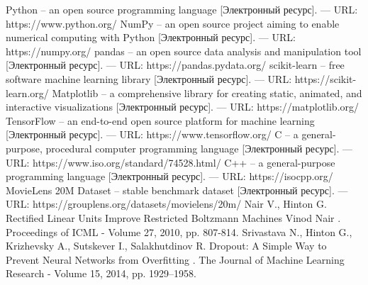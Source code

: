 \documentclass[a4paper,article,14pt]{extarticle}
\begin{document}
\begin{thebibliography}{1}
 Python -- an open source programming language [Электронный ресурс]. — URL: https://www.python.org/
 NumPy -- an open source project aiming to enable numerical computing with Python [Электронный ресурс]. — URL: https://numpy.org/
 pandas -- an open source data analysis and manipulation tool [Электронный ресурс]. — URL: https://pandas.pydata.org/
 scikit-learn -- free software machine learning library [Электронный ресурс]. — URL: https://scikit-learn.org/
 Matplotlib -- a comprehensive library for creating static, animated, and interactive visualizations [Электронный ресурс]. — URL: https://matplotlib.org/
 TensorFlow -- an end-to-end open source platform for machine learning [Электронный ресурс]. — URL: https://www.tensorflow.org/
 C -- a general-purpose, procedural computer programming language [Электронный ресурс]. — URL: https://www.iso.org/standard/74528.html/
 C++ -- a general-purpose programming language [Электронный ресурс]. — URL: https://isocpp.org/
 MovieLens 20M Dataset -- stable benchmark dataset [Электронный ресурс]. — URL: https://grouplens.org/datasets/movielens/20m/
 Nair V., Hinton G. \flqq Rectified Linear Units Improve Restricted Boltzmann Machines Vinod Nair \frqq. Proceedings of ICML - Volume 27, 2010, pp. 807-814.
 Srivastava N., Hinton G., Krizhevsky A., Sutskever I., Salakhutdinov R. \flqq Dropout: A Simple Way to Prevent Neural Networks from Overfitting \frqq. The Journal of Machine Learning Research - Volume 15, 2014, pp. 1929–1958.
\end{thebibliography}
\end{document}
